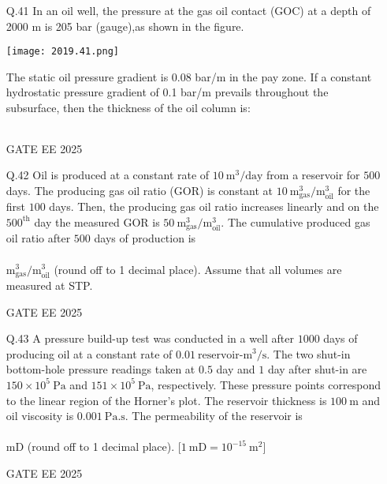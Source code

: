 \documentclass[journal]{IEEEtran}
\begin{document}
\begin{enumerate}[leftmargin=*,series=q]
\setcounter{enumi}{40}

\item[Q.41] In an oil well, the pressure at the gas oil contact (GOC) at a depth of 2000 m is 205 bar (gauge),as shown in the figure.

\texttt{[image: 2019.41.png]}

The static oil pressure gradient is 0.08 bar/m in the pay zone. If a constant hydrostatic pressure gradient of 0.1 bar/m prevails throughout the subsurface, then the thickness of the oil column is:

\begin{tabular}{llll}
\end{tabular}
GATE EE 2025
\vspace{0.5cm}
\item[Q.42] Oil is produced at a constant rate of $10 \ \text{m}^3/\text{day}$ from a reservoir for $500$ days.  
The producing gas oil ratio (GOR) is constant at $10 \ \text{m}^3_{\text{gas}}/\text{m}^3_{\text{oil}}$ for the first $100$ days.  
Then, the producing gas oil ratio increases linearly and on the $500^{\text{th}}$ day the measured GOR is $50 \ \text{m}^3_{\text{gas}}/\text{m}^3_{\text{oil}}$.  
The cumulative produced gas oil ratio after $500$ days of production is \\\\ $\text{m}^3_{\text{gas}}/\text{m}^3_{\text{oil}}$ (round off to 1 decimal place).  
Assume that all volumes are measured at STP.  

GATE EE 2025

\vspace{0.5cm}
\item[Q.43] A pressure build-up test was conducted in a well after $1000$ days of producing oil at a constant rate of $0.01 \ \text{reservoir-m}^3/\text{s}$.  
The two shut-in bottom-hole pressure readings taken at $0.5$ day and $1$ day after shut-in are $150 \times 10^5 \ \text{Pa}$ and $151 \times 10^5 \ \text{Pa}$, respectively.  
These pressure points correspond to the linear region of the Horner's plot.  
The reservoir thickness is $100 \ \text{m}$ and oil viscosity is $0.001 \ \text{Pa.s}$.  
The permeability of the reservoir is \\\\ mD (round off to 1 decimal place).  
[$1 \ \text{mD} = 10^{-15} \ \text{m}^2$]  


GATE EE 2025


\end{enumerate}
\end{document}
